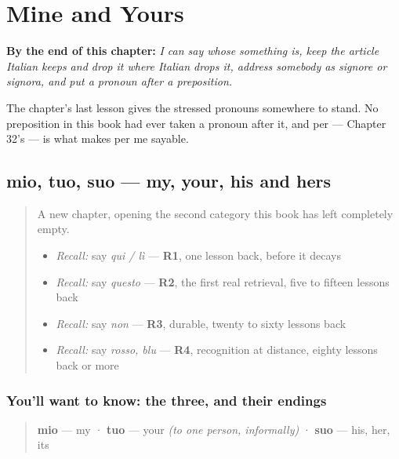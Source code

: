 
\chapter{Mine and Yours}
\label{ch:it-possessivi}

\begin{chapteropening}
\textbf{By the end of this chapter:} \emph{I can say whose something is, keep the article Italian keeps and drop it where Italian drops it, address somebody as signore or signora, and put a pronoun after a preposition.}

The chapter's last lesson gives the stressed pronouns somewhere to stand. No preposition in this book had ever taken a pronoun after it, and per — Chapter 32's — is what makes per me sayable.
\end{chapteropening}

\section[mio, tuo, suo]{mio, tuo, suo — my, your, his and hers}

\label{lesson:IT-C34-mio-tuo-suo}



\begin{quote}
A new chapter, opening the second category this book has left completely empty.

\begin{itemize}
\raggedright
  \item \emph{Recall:} say \emph{qui / lì} — \textbf{R1}, one lesson back, before it decays
  \item \emph{Recall:} say \emph{questo} — \textbf{R2}, the first real retrieval, five to fifteen lessons back
  \item \emph{Recall:} say \emph{non} — \textbf{R3}, durable, twenty to sixty lessons back
  \item \emph{Recall:} say \emph{rosso, blu} — \textbf{R4}, recognition at distance, eighty lessons back or more
\end{itemize}
\end{quote}

\subsection*{You'll want to know: the three, and their endings}
\begin{quote}
\textbf{mio} — my · \textbf{tuo} — your \emph{(to one person, informally)} · \textbf{suo} — his, her, its
\end{quote}

